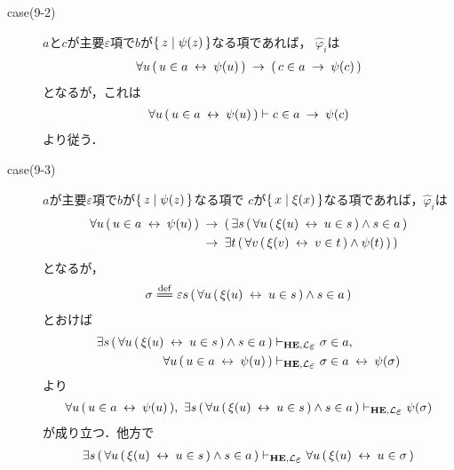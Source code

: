 \begin{metaprf}
\begin{description}
\begin{description}
					\item[case(9-2)] $a$と$c$が主要$\varepsilon$項で$b$が$\{\, z \mid \psi(z)\, \}$なる項であれば，
						$\widehat{\varphi}_{i}$は
						\begin{align}
							\forall u\, (\, u \in a \hspace{0.25em}\leftrightarrow\hspace{0.25em} \psi(u)\, ) 
							\hspace{0.25em}\rightarrow\hspace{0.25em} (\, c \in a \hspace{0.25em}\rightarrow\hspace{0.25em} \psi(c)\, )
						\end{align}
						となるが，これは
						\begin{align}
							\forall u\, (\, u \in a \hspace{0.25em}\leftrightarrow\hspace{0.25em} \psi(u)\, ) \vdash c \in a \hspace{0.25em}\rightarrow\hspace{0.25em} \psi(c)
						\end{align}
						より従う．
						
					\item[case(9-3)] $a$が主要$\varepsilon$項で$b$が$\{\, z \mid \psi(z)\, \}$なる項で
						$c$が$\{\, x \mid \xi(x)\, \}$なる項であれば，$\widehat{\varphi}_{i}$は
						\begin{align}
							\forall u\, (\, u \in a \hspace{0.25em}\leftrightarrow\hspace{0.25em} \psi(u)\, ) 
							&\hspace{0.25em}\rightarrow\hspace{0.25em} (\, \exists s\, (\, \forall u\, (\, \xi(u) \hspace{0.25em}\leftrightarrow\hspace{0.25em} u \in s\, ) \wedge s \in a\, ) \\
							&\hspace{0.25em}\rightarrow\hspace{0.25em} \exists t\, (\, \forall v\, (\, \xi(v) \hspace{0.25em}\leftrightarrow\hspace{0.25em} v \in t\, ) \wedge \psi(t)\, )\, )
						\end{align}
						となるが，
						\begin{align}
							\sigma \defeq \varepsilon s\, (\, \forall u\, (\, \xi(u) \lrarrow u \in s\, ) \wedge s \in a\, )
						\end{align}
						とおけば
						\begin{align}
							\exists s\, (\, \forall u\, (\, \xi(u) \lrarrow u \in s\, ) \wedge s \in a\, ) 
							&\provable{\mbox{{\bf HE}},\lang{\varepsilon}} \sigma \in a, \\
							\forall u\, (\, u \in a \lrarrow \psi(u)\, )
							&\provable{\mbox{{\bf HE}},\lang{\varepsilon}} \sigma \in a \lrarrow \psi(\sigma)
						\end{align}
						より
						\begin{align}
							\forall u\, (\, u \in a \lrarrow \psi(u)\, ),\ 
							\exists s\, (\, \forall u\, (\, \xi(u) \lrarrow u \in s\, ) \wedge s \in a\, ) 
							\provable{\mbox{{\bf HE}},\lang{\varepsilon}} \psi(\sigma)
						\end{align}
						が成り立つ．他方で
						\begin{align}
							\exists s\, (\, \forall u\, (\, \xi(u) \lrarrow u \in s\, ) \wedge s \in a\, ) 
							\provable{\mbox{{\bf HE}},\lang{\varepsilon}} \forall u\, (\, \xi(u) \lrarrow u \in \sigma\, )
						\end{align}

\end{description}
\end{description}
\end{metaprf}
